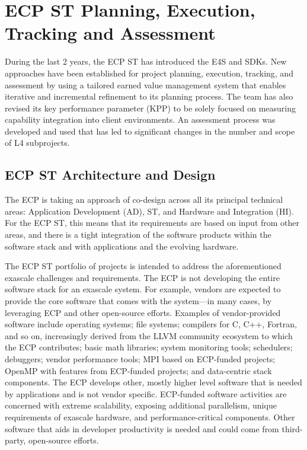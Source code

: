 \clearpage
\newpage
\section{ECP ST Planning, Execution, Tracking and Assessment}\label{sect:PETA}
During the last 2 years, the ECP ST has introduced the E4S and SDKs.  New approaches have been established for project planning, execution, tracking, and assessment by using a tailored earned value management system that enables iterative and incremental refinement to its planning process.  The team has also revised its key performance parameter (KPP) to be solely focused on measuring capability integration into client environments.  An assessment process was developed and used that has led to significant changes in the number and scope of L4 subprojects.

\subsection{ECP ST Architecture and Design}
The ECP is taking an approach of co-design across all its principal technical areas: Application Development (AD), ST, and Hardware and Integration (HI). For the ECP ST, this means that its requirements are based on input from other areas, and there is a tight integration of the software products within the software stack and with applications and the evolving hardware. 

The ECP ST portfolio of projects is intended to address the aforementioned exascale challenges and requirements. The ECP is not developing the entire software stack for an exascale system. For example, vendors are expected to provide the core software that comes with the system---in many cases, by leveraging ECP and other open-source efforts. Examples of vendor-provided software include operating systems; file systems; compilers for C, C++, Fortran, and so on, increasingly derived from the LLVM community ecosystem to which the ECP contributes; basic math libraries; system monitoring tools; schedulers; debuggers; vendor performance tools; MPI based on ECP-funded projects; OpenMP with features from ECP-funded projects; and data-centric stack components. The ECP develops other, mostly higher level software that is needed by applications and is not vendor specific. ECP-funded software activities are concerned with extreme scalability, exposing additional parallelism, unique requirements of exascale hardware, and performance-critical components. Other software that aids in developer productivity is needed and could come from third-party, open-source efforts.

